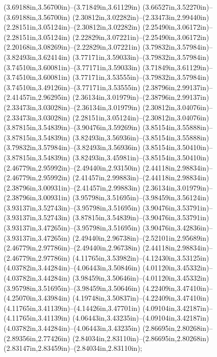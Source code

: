 (3.69188in,3.56700in)--(3.71849in,3.61129in) (3.66527in,3.52270in)--(3.69188in,3.56700in) (2.30812in,3.02282in)--(2.33473in,2.99440in) (2.28151in,3.05124in)--(2.30812in,3.02282in) (2.25490in,3.06172in)--(2.28151in,3.05124in) (2.22829in,3.07221in)--(2.25490in,3.06172in) (2.20168in,3.08269in)--(2.22829in,3.07221in) (3.79832in,3.57984in)--(3.82493in,3.62414in) (3.77171in,3.59033in)--(3.79832in,3.57984in) (3.74510in,3.60081in)--(3.77171in,3.59033in) (3.71849in,3.61129in)--(3.74510in,3.60081in) (3.77171in,3.53555in)--(3.79832in,3.57984in) (3.74510in,3.49126in)--(3.77171in,3.53555in) (2.38796in,2.99137in)--(2.41457in,2.96295in) (2.36134in,3.01979in)--(2.38796in,2.99137in) (2.33473in,3.03028in)--(2.36134in,3.01979in) (2.30812in,3.04076in)--(2.33473in,3.03028in) (2.28151in,3.05124in)--(2.30812in,3.04076in) (3.87815in,3.54839in)--(3.90476in,3.59269in) (3.85154in,3.55888in)--(3.87815in,3.54839in) (3.82493in,3.56936in)--(3.85154in,3.55888in) (3.79832in,3.57984in)--(3.82493in,3.56936in) (3.85154in,3.50410in)--(3.87815in,3.54839in) (3.82493in,3.45981in)--(3.85154in,3.50410in) (2.46779in,2.95992in)--(2.49440in,2.93150in) (2.44118in,2.98834in)--(2.46779in,2.95992in) (2.41457in,2.99883in)--(2.44118in,2.98834in) (2.38796in,3.00931in)--(2.41457in,2.99883in) (2.36134in,3.01979in)--(2.38796in,3.00931in) (3.95798in,3.51695in)--(3.98459in,3.56124in) (3.93137in,3.52743in)--(3.95798in,3.51695in) (3.90476in,3.53791in)--(3.93137in,3.52743in) (3.87815in,3.54839in)--(3.90476in,3.53791in) (3.93137in,3.47265in)--(3.95798in,3.51695in) (3.90476in,3.42836in)--(3.93137in,3.47265in) (2.49440in,2.96738in)--(2.52101in,2.95689in) (2.46779in,2.97786in)--(2.49440in,2.96738in) (2.44118in,2.98834in)--(2.46779in,2.97786in) (4.11765in,3.53982in)--(4.12430in,3.53125in) (4.03782in,3.44284in)--(4.06443in,3.50846in) (4.01120in,3.45332in)--(4.03782in,3.44284in) (3.98459in,3.50646in)--(4.01120in,3.45332in) (3.95798in,3.51695in)--(3.98459in,3.50646in) (4.22409in,3.47410in)--(4.25070in,3.43984in) (4.19748in,3.50837in)--(4.22409in,3.47410in) (4.11765in,3.41139in)--(4.14426in,3.47701in) (4.09104in,3.42187in)--(4.11765in,3.41139in) (4.06443in,3.43235in)--(4.09104in,3.42187in) (4.03782in,3.44284in)--(4.06443in,3.43235in) (2.86695in,2.80268in)--(2.89356in,2.77426in) (2.84034in,2.83110in)--(2.86695in,2.80268in) (2.83147in,2.83459in)--(2.84034in,2.83110in);
